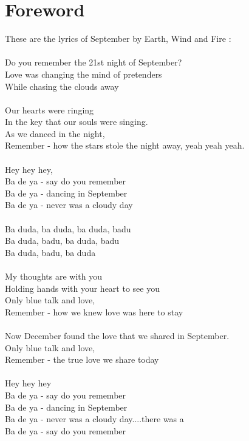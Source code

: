\documentclass{42-en}
\begin{document}
\chapter{Foreword}
{
	These are the lyrics of September by Earth, Wind and Fire :\\
	\\
	\small
		Do you remember the 21st night of September?\\
		Love was changing the mind of pretenders\\
		While chasing the clouds away\\
		\\
		Our hearts were ringing\\
		In the key that our souls were singing.\\
		As we danced in the night,\\
		Remember - how the stars stole the night away, yeah yeah yeah.\\
		\\
		Hey hey hey,\\
		Ba de ya - say do you remember\\
		Ba de ya - dancing in September\\
		Ba de ya - never was a cloudy day\\
		\\
		Ba duda, ba duda, ba duda, badu\\
		Ba duda, badu, ba duda, badu\\
		Ba duda, badu, ba duda\\
		\\
		My thoughts are with you\\
		Holding hands with your heart to see you\\
		Only blue talk and love,\\
		Remember - how we knew love was here to stay\\
		\\
		Now December found the love that we shared in September.\\
		Only blue talk and love,\\
		Remember - the true love we share today\\
		\\
		Hey hey hey\\
		Ba de ya - say do you remember\\
		Ba de ya - dancing in September\\
		Ba de ya - never was a cloudy day....there was a\\
		Ba de ya - say do you remember\\
}
\end{document}
